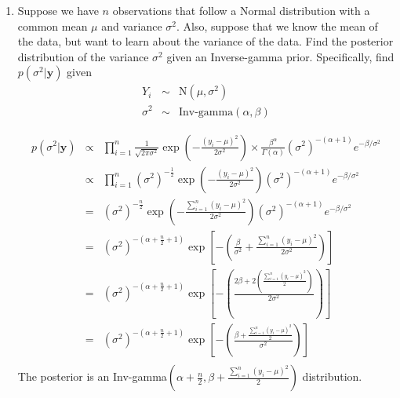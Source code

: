 \documentclass[10pt,a4paper]{article}
\newcommand{\red}{\color{red}}
\newcommand{\black}{\color{black}}
\begin{document}
\begin{enumerate}
\begin{enumerate}
\end{enumerate}

\bigskip

\item Suppose we have $n$ observations that follow a Normal distribution with a common mean $\mu$ and variance $\sigma^2$.  Also, suppose that we know the mean of the data, but want to learn about the variance of the data.  Find the posterior distribution of the variance $\sigma^2$ given an Inverse-gamma prior.  Specifically, find $p(\sigma^2 | \mathbf{y})$ given
\begin{eqnarray*}
Y_i &\sim& \text{N}(\mu, \sigma^2) \\
\sigma^2 &\sim& \text{Inv-gamma}(\alpha, \beta)
\end{eqnarray*}

\medskip \red
\begin{eqnarray*}
  p(\sigma^2|\mathbf{y}) &\propto& \prod_{i=1}^n \frac{1}{\sqrt{2\pi\sigma^2}} \exp
  \left( -\frac{(y_i - \mu)^2}{2\sigma^2} \right) \times 
  \frac{\beta^{\alpha}}{\Gamma(\alpha)} (\sigma^2)^{-(\alpha +
  1)} e^{-\beta / \sigma^2} \\
&\propto& \prod_{i=1}^n (\sigma^2)^{-\frac{1}{2}} \exp
  \left( -\frac{(y_i - \mu)^2}{2\sigma^2} \right)  (\sigma^2)^{-(\alpha +
  1)} e^{-\beta / \sigma^2} \\
&=& (\sigma^2)^{-\frac{n}{2}} \exp
  \left( -\frac{\sum_{i=1}^n (y_i - \mu)^2}{2\sigma^2} \right)  (\sigma^2)^{-(\alpha +
  1)} e^{-\beta / \sigma^2} \\
 &=& (\sigma^2)^{-(\alpha + \frac{n}{2}+1)} \exp
  \left[ -\left( \frac{\beta}{\sigma^2} + \frac{\sum_{i=1}^n (y_i -
        \mu)^2}{2\sigma^2} \right) \right]  \\
  &=& (\sigma^2)^{-(\alpha + \frac{n}{2}+1)} \exp
  \left[ -\left( \frac{2\beta + 2 \left( \frac{\sum_{i=1}^n (y_i -
        \mu)^2}{2} \right)}{2\sigma^2} \right) \right]  \\
&=& (\sigma^2)^{-(\alpha + \frac{n}{2}+1)} \exp
  \left[ -\left( \frac{\beta + \frac{\sum_{i=1}^n (y_i -
        \mu)^2}{2} }{\sigma^2} \right) \right]  \\
\end{eqnarray*}
The posterior is
an Inv-gamma$\left( \alpha+ \frac{n}{2}, \beta + \frac{\sum_{i=1}^n (y_i -
        \mu)^2}{2}\right)$ distribution.
\medskip \black 
\end{enumerate}
\end{document}
